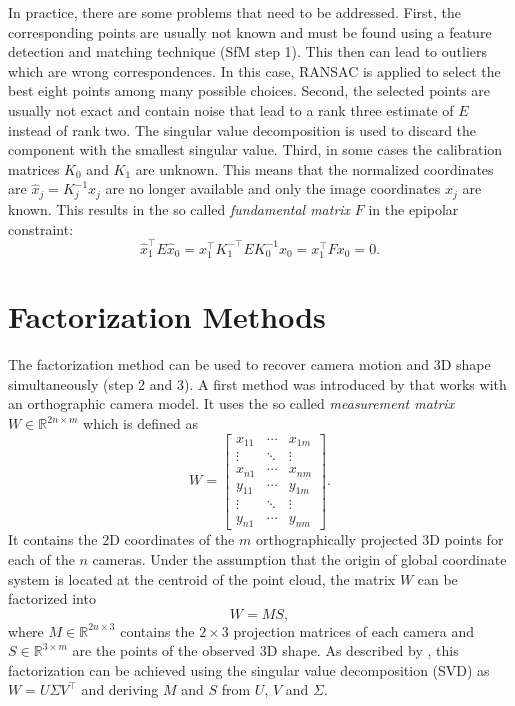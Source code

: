 		In practice, there are some problems that need to be addressed.
		First, the corresponding points are usually not known and must be found using a feature detection and matching technique (SfM step 1).
		This then can lead to outliers which are wrong correspondences.
		In this case, {RANSAC} is applied to select the best eight points among many possible choices.
		Second, the selected points are usually not exact and contain noise that lead to a rank three estimate of $E$ instead of rank two.
		The singular value decomposition is used to discard the component with the smallest singular value.
		Third, in some cases the calibration matrices $K_0$ and $K_1$ are unknown.
		This means that the normalized coordinates are $\hat{x}_j = K_j^{-1} x_j$ are no longer available and only the image coordinates $x_j$ are known.
		This results in the so called \emph{fundamental matrix} $F$ in the epipolar constraint:
		\begin{equation}
			\hat{x}_1^\top E \hat{x}_0 = x_1^\top K_1^{-\top} E K_0^{-1} x_0 = x_1^\top F x_0 = 0.
		\end{equation}
		
	\section{Factorization Methods}
		The factorization method can be used to recover camera motion and 3D shape simultaneously (step 2 and 3).
		A first method was introduced by \cite{tomasi1992factorization} that works with an orthographic camera model.
		It uses the so called \emph{measurement matrix} $W \in \mathbb{R}^{2n \times m}$ which is defined as
		\begin{equation}\label{eq:measurement_matrix}
			W =
			\begin{bmatrix}
				x_{11} & \cdots & x_{1m} \\ 
				\vdots & \ddots & \vdots \\ 
				x_{n1} & \cdots & x_{nm} \\ 
				y_{11} & \cdots & y_{1m} \\ 
				\vdots & \ddots & \vdots \\ 
				y_{n1} & \cdots & y_{nm}
			\end{bmatrix}. 
		\end{equation}
		It contains the 2D coordinates of the $m$ orthographically projected 3D points for each of the $n$ cameras.
		Under the assumption that the origin of global coordinate system is located at the centroid of the point cloud, the matrix $W$ can be factorized into
		\begin{equation}\label{eq:factorization_method}
			W = MS,
		\end{equation}
		where $M \in \mathbb{R}^{2n \times 3}$ contains the $2 \times 3$ projection matrices of each camera and $S \in \mathbb{R}^{3 \times m}$  are the points of the observed 3D shape.
		As described by \cite{tomasi1992factorization}, this factorization can be achieved using the singular value decomposition (SVD) as $W = U \varSigma V^\top$ and deriving $M$ and $S$ from $U$, $V$ and $\varSigma$.
		
